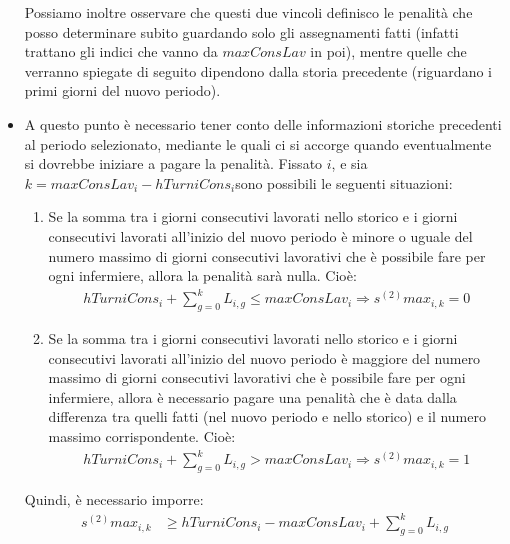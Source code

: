 \begin{itemize}
Possiamo inoltre osservare che questi due vincoli definisco le penalità che posso determinare subito guardando solo gli assegnamenti fatti (infatti trattano gli indici che vanno da $maxConsLav$ in poi), mentre quelle che verranno spiegate di seguito dipendono dalla storia precedente (riguardano i primi giorni del nuovo periodo).

\item A questo punto è necessario tener conto delle informazioni storiche precedenti al periodo selezionato, mediante le quali ci si accorge quando eventualmente si dovrebbe iniziare a pagare la penalità. Fissato $i$, e sia $k = maxConsLav_i - hTurniCons_i$sono possibili le seguenti situazioni:
\begin{enumerate}
\item Se la somma tra i giorni consecutivi lavorati nello storico e i giorni consecutivi lavorati all'inizio del nuovo periodo è minore o uguale del numero massimo di giorni consecutivi lavorativi che è possibile fare per ogni infermiere, allora la penalità sarà nulla. Cioè:
\begin{equation}
\begin{split}
hTurniCons_i + \sum_{g=0}^k L_{i, g} \leq maxConsLav_i \Longrightarrow s^{(2)}max_{i, k} = 0 
\end{split}
\end{equation}

\item Se la somma tra i giorni consecutivi lavorati nello storico e i giorni consecutivi lavorati all'inizio del nuovo periodo è maggiore del numero massimo di giorni consecutivi lavorativi che è possibile fare per ogni infermiere, allora è necessario pagare una penalità che è data dalla differenza tra quelli fatti (nel nuovo periodo e nello storico) e il numero massimo corrispondente. Cioè:
\begin{equation}
\begin{split}
hTurniCons_i + \sum_{g=0}^k L_{i, g} > maxConsLav_i \Longrightarrow s^{(2)}max_{i, k} = 1
\end{split}
\end{equation}
\end{enumerate}
Quindi, è necessario imporre:
\begin{equation}
\begin{split}
s^{(2)}max_{i, k} &\geq hTurniCons_i - maxConsLav_i + \sum_{g = 0}^{k} L_{i, g}
\end{split}
\end{equation}


\end{itemize}
